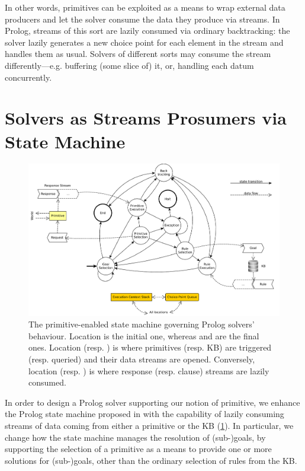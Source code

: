 \documentclass[12pt,a4paper,openright,twoside]{book}
\begin{document}
%
In other words, primitives can be exploited as a means to wrap external data producers and let the solver consume the data they produce via streams.
%
In Prolog, streams of this sort are lazily consumed via ordinary backtracking: the solver lazily generates a new choice point for each element in the stream and handles them as usual.
%
Solvers of different sorts may consume the stream differently---e.g. buffering (some slice of) it, or, handling each datum concurrently.

\section{Solvers as Streams Prosumers via State Machine}
\label{sec:state-machine}

\begin{figure}\centering
    \includegraphics[width=\linewidth]{figures/2p-fsa-dataflow}
    \caption[The primitive-enabled state machine governing Prolog solvers' behaviour]{The primitive-enabled state machine governing Prolog solvers' behaviour. Location  is the initial one, whereas  and  are the final ones. Location  (resp. )  is where primitives (resp. KB) are triggered (resp. queried) and their data streams are opened. Conversely, location  (resp. )  is where response (resp. clause) streams are lazily consumed.}
    \label{fig:prolog-fsa}
\end{figure}

In order to design a Prolog solver supporting our notion of primitive, we enhance the Prolog state machine proposed in \cite{tuprolog-sac08} with the capability of lazily consuming streams of data coming from either a primitive or the KB (\cref{fig:prolog-fsa}).
%
In particular, we change how the state machine manages the resolution of (sub-)goals, by supporting the selection of a primitive as a means to provide one or more solutions for (sub-)goals, other than the ordinary selection of rules from the KB.
\end{document}
